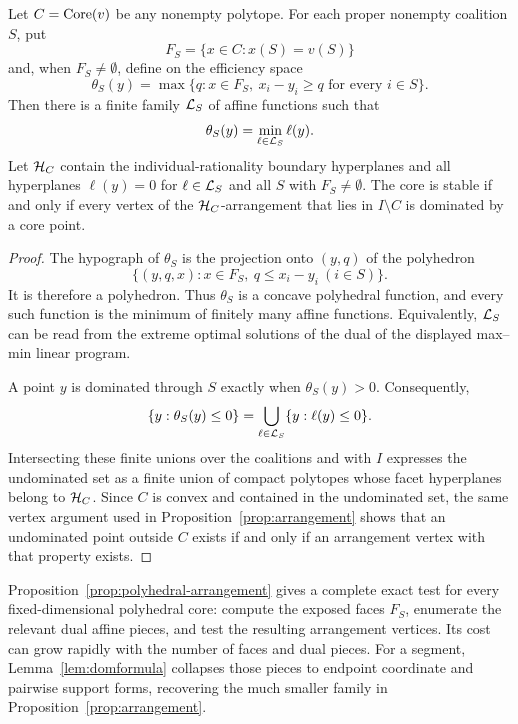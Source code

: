 \begin{proposition}
\label{prop:polyhedral-arrangement}
Let $C=\operatorname{Core}(v)$ be any nonempty polytope.  For each proper nonempty
coalition $S$, put
\[
 F_S=\{x\in C:x(S)=v(S)\}
\]
and, when $F_S\ne\emptyset$, define on the efficiency space
\[
 \theta_S(y)=
 \max\{q:x\in F_S,\ x_i-y_i\geq q\text{ for every }i\in S\}.
\]
Then there is a finite family ${\cal L}_S$ of affine functions such that
\[
 \theta_S(y)=\min_{\ell\in{\cal L}_S}\ell(y).
\]
Let ${\cal H}_C$ contain the individual-rationality boundary hyperplanes and
all hyperplanes $\ell(y)=0$ for $\ell\in{\cal L}_S$ and all $S$ with
$F_S\ne\emptyset$.  The core is stable if and only if every vertex of the
${\cal H}_C$-arrangement that lies in $I\setminus C$ is dominated by a core
point.
\end{proposition}

\begin{proof}
The hypograph of $\theta_S$ is the projection onto $(y,q)$ of the polyhedron
\[
 \{(y,q,x):x\in F_S,\ q\leq x_i-y_i\ (i\in S)\}.
\]
It is therefore a polyhedron.  Thus $\theta_S$ is a concave polyhedral
function, and every such function is the minimum of finitely many affine
functions.  Equivalently, ${\cal L}_S$ can be read from the extreme optimal
solutions of the dual of the displayed max--min linear program.

A point $y$ is dominated through $S$ exactly when $\theta_S(y)>0$.
Consequently,
\[
 \{y:\theta_S(y)\leq0\}
   =\bigcup_{\ell\in{\cal L}_S}\{y:\ell(y)\leq0\}.
\]
Intersecting these finite unions over the coalitions and with $I$ expresses
the undominated set as a finite union of compact polytopes whose facet
hyperplanes belong to ${\cal H}_C$.  Since $C$ is convex and contained in the
undominated set, the same vertex argument used in
Proposition~\ref{prop:arrangement} shows that an undominated point outside
$C$ exists if and only if an arrangement vertex with that property exists.
\end{proof}

Proposition~\ref{prop:polyhedral-arrangement} gives a complete exact test for
every fixed-dimensional polyhedral core: compute the exposed faces $F_S$,
enumerate the relevant dual affine pieces, and test the resulting arrangement
vertices.  Its cost can grow rapidly with the number of faces and dual pieces.
For a segment, Lemma~\ref{lem:domformula} collapses those pieces to endpoint
coordinate and pairwise support forms, recovering the much smaller family in
Proposition~\ref{prop:arrangement}.

